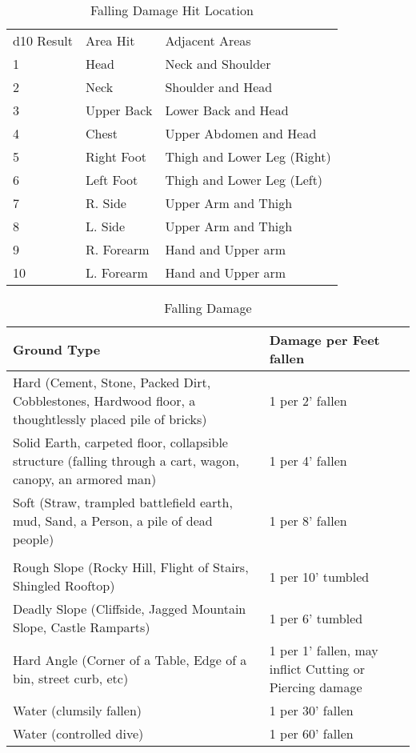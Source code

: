 \documentclass[oneside,11pt,english]{book}
\begin{document}
\begin{table}[!ht]
	\centering
	\caption{Falling Damage Hit Location}
	\label{tab:falling-damage-hit-location}
	\begin{tabu} spread 0pt{X[-1,c]XX[2]}
d10 Result& Area Hit &Adjacent Areas\\
1 &Head&Neck and Shoulder \\
2 &Neck&Shoulder and Head \\
3 &Upper Back&Lower Back and Head \\
4 &Chest&Upper Abdomen and Head \\
5 &Right Foot&Thigh and Lower Leg (Right) \\
6 &Left Foot&Thigh and Lower Leg (Left) \\
7 &R. Side&Upper Arm and Thigh \\
8 &L. Side&Upper Arm and Thigh\\
9 &R. Forearm&Hand and Upper arm\\
10&L. Forearm&Hand and Upper arm\\
	\end{tabu}
\end{table}

\begin{table}[!ht]
	\caption{Falling Damage}
	\label{tab:Falling Damage}
	\begin{tabu} spread 0pt{X[2]X}
Ground Type&Damage per Feet fallen\\\toprule
Hard (Cement, Stone, Packed Dirt, Cobblestones, Hardwood floor, a thoughtlessly placed pile of bricks)&1 per 2’ fallen\\
Solid Earth, carpeted floor, collapsible structure (falling through a cart, wagon, canopy, an armored man)&1 per 4’ fallen\\
Soft (Straw, trampled battlefield earth, mud, Sand, a Person, a pile of dead people)&1 per 8’ fallen\\
	\\
Rough Slope (Rocky Hill, Flight of Stairs, Shingled Rooftop)&1 per 10’ tumbled\\
Deadly Slope (Cliffside, Jagged Mountain Slope, Castle Ramparts)&1 per 6’ tumbled\\
Hard Angle (Corner of a Table, Edge of a bin, street curb, etc)&1 per 1’ fallen, may inflict Cutting or Piercing damage\\ %
Water (clumsily fallen)&1 per 30’ fallen\\
Water (controlled dive)&1 per 60’ fallen\\
	\end{tabu}
\end{table}
\end{document}
